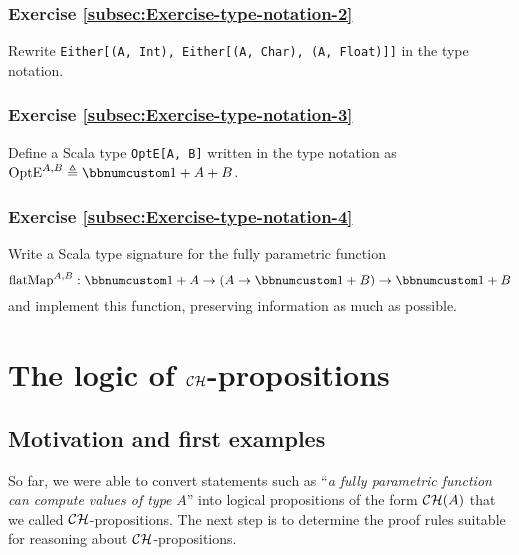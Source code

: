 \subsubsection{Exercise \label{subsec:Exercise-type-notation-2}\ref{subsec:Exercise-type-notation-2}}

Rewrite \lstinline!Either[(A, Int), Either[(A, Char), (A, Float)]]!
in the type notation.

\subsubsection{Exercise \label{subsec:Exercise-type-notation-3}\ref{subsec:Exercise-type-notation-3}}

Define a Scala type \lstinline!OptE[A, B]! written in the type notation
as $\text{OptE}^{A,B}\triangleq\bbnum 1+A+B$.

\subsubsection{Exercise \label{subsec:Exercise-type-notation-4}\ref{subsec:Exercise-type-notation-4}}

Write a Scala type signature for the fully parametric function 
\[
\text{flatMap}^{A,B}:\bbnum 1+A\rightarrow\left(A\rightarrow\bbnum 1+B\right)\rightarrow\bbnum 1+B
\]
and implement this function, preserving information as much as possible.

\section{The logic of ${\cal CH}$-propositions}

\subsection{Motivation and first examples\label{subsec:ch-Motivation-and-first-examples}}

So far, we were able to convert statements such as \textsf{``}\emph{a fully
parametric function can compute values of type} $A$\textsf{''} into logical
propositions of the form ${\cal CH}(A)$ that we called ${\cal CH}$-propositions.
The next step is to determine the proof rules suitable for reasoning
about ${\cal CH}$-propositions.

